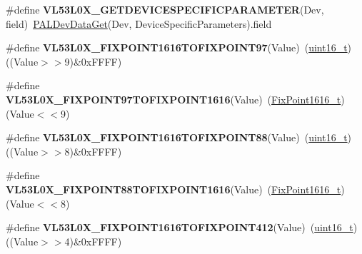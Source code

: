 \begin{DoxyCompactItemize}
\item 
\mbox{\label{group__VL53L0X__define__GeneralMacro__group_ga8179769a43cf26099a37748eb90209ea}} 
\#define {\bfseries V\+L53\+L0\+X\+\_\+\+G\+E\+T\+D\+E\+V\+I\+C\+E\+S\+P\+E\+C\+I\+F\+I\+C\+P\+A\+R\+A\+M\+E\+T\+ER}(Dev,  field)~\hyperlink{group__VL53L0X__platform__group_ga21f3ef1fbe84f5cf77d989c95f21ad0a}{P\+A\+L\+Dev\+Data\+Get}(Dev, Device\+Specific\+Parameters).field
\item 
\mbox{\label{group__VL53L0X__define__GeneralMacro__group_ga0409c7cdb1c9cf039c1385761a8267f7}} 
\#define {\bfseries V\+L53\+L0\+X\+\_\+\+F\+I\+X\+P\+O\+I\+N\+T1616\+T\+O\+F\+I\+X\+P\+O\+I\+N\+T97}(Value)~(\hyperlink{vl53l0x__types_8h_a273cf69d639a59973b6019625df33e30}{uint16\+\_\+t})((Value$>$$>$9)\&0x\+F\+F\+F\+F)
\item 
\mbox{\label{group__VL53L0X__define__GeneralMacro__group_ga06b0d6dd3fa847671dcb77c197ead691}} 
\#define {\bfseries V\+L53\+L0\+X\+\_\+\+F\+I\+X\+P\+O\+I\+N\+T97\+T\+O\+F\+I\+X\+P\+O\+I\+N\+T1616}(Value)~(\hyperlink{vl53l0x__types_8h_afb910790161809fc76e1a274a6349384}{Fix\+Point1616\+\_\+t})(Value$<$$<$9)
\item 
\mbox{\label{group__VL53L0X__define__GeneralMacro__group_ga5d75b6346e45f0ff8b5cbc8c9bf81a77}} 
\#define {\bfseries V\+L53\+L0\+X\+\_\+\+F\+I\+X\+P\+O\+I\+N\+T1616\+T\+O\+F\+I\+X\+P\+O\+I\+N\+T88}(Value)~(\hyperlink{vl53l0x__types_8h_a273cf69d639a59973b6019625df33e30}{uint16\+\_\+t})((Value$>$$>$8)\&0x\+F\+F\+F\+F)
\item 
\mbox{\label{group__VL53L0X__define__GeneralMacro__group_ga0d4d860c33534371473b70a8db88dfcf}} 
\#define {\bfseries V\+L53\+L0\+X\+\_\+\+F\+I\+X\+P\+O\+I\+N\+T88\+T\+O\+F\+I\+X\+P\+O\+I\+N\+T1616}(Value)~(\hyperlink{vl53l0x__types_8h_afb910790161809fc76e1a274a6349384}{Fix\+Point1616\+\_\+t})(Value$<$$<$8)
\item 
\mbox{\label{group__VL53L0X__define__GeneralMacro__group_ga8365bb81241d8e21603f169fcfb7b541}} 
\#define {\bfseries V\+L53\+L0\+X\+\_\+\+F\+I\+X\+P\+O\+I\+N\+T1616\+T\+O\+F\+I\+X\+P\+O\+I\+N\+T412}(Value)~(\hyperlink{vl53l0x__types_8h_a273cf69d639a59973b6019625df33e30}{uint16\+\_\+t})((Value$>$$>$4)\&0x\+F\+F\+F\+F)
$$
\end{DoxyCompactItemize}
